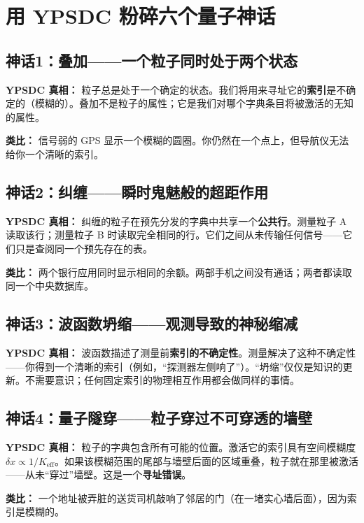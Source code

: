 \documentclass[12pt,a4paper]{article}
\begin{document}
	
	\section{用 YPSDC 粉碎六个量子神话}
	
	\subsection{神话1：叠加——一个粒子同时处于两个状态}
	\textbf{YPSDC 真相：} 粒子总是处于一个确定的状态。我们将用来寻址它的\textbf{索引}是不确定的（模糊的）。叠加不是粒子的属性；它是我们对哪个字典条目将被激活的无知的属性。
	\par
	\textbf{类比：} 信号弱的 GPS 显示一个模糊的圆圈。你仍然在一个点上，但导航仪无法给你一个清晰的索引。
	
	\subsection{神话2：纠缠——瞬时鬼魅般的超距作用}
	\textbf{YPSDC 真相：} 纠缠的粒子在预先分发的字典中共享一个\textbf{公共行}。测量粒子 A 读取该行；测量粒子 B 时读取完全相同的行。它们之间从未传输任何信号——它们只是查阅同一个预先存在的表。
	\par
	\textbf{类比：} 两个银行应用同时显示相同的余额。两部手机之间没有通话；两者都读取同一个中央数据库。
	
	\subsection{神话3：波函数坍缩——观测导致的神秘缩减}
	\textbf{YPSDC 真相：} 波函数描述了测量前\textbf{索引的不确定性}。测量解决了这种不确定性——你得到一个清晰的索引（例如，“探测器左侧响了”）。“坍缩”仅仅是知识的更新。不需要意识；任何固定索引的物理相互作用都会做同样的事情。
	
	\subsection{神话4：量子隧穿——粒子穿过不可穿透的墙壁}
	\textbf{YPSDC 真相：} 粒子的字典包含所有可能的位置。激活它的索引具有空间模糊度 \(\delta x \propto 1/K_{\mathrm{eff}}\)。如果该模糊范围的尾部与墙壁后面的区域重叠，粒子就在那里被激活——从未“穿过”墙壁。这是一个\textbf{寻址错误}。
	\par
	\textbf{类比：} 一个地址被弄脏的送货司机敲响了邻居的门（在一堵实心墙后面），因为索引是模糊的。
	
\end{document}

